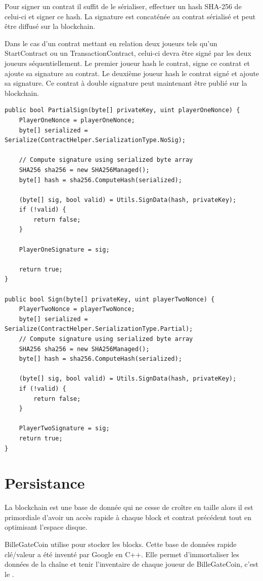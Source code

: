 \documentclass{article}
\begin{document}
Pour signer un contrat il suffit de le sérialiser, effectuer un hash SHA-256 de celui-ci et signer ce hash. La signature est concaténée au contrat sérialisé et peut être diffusé sur la blockchain.

Dans le cas d'un contrat mettant en relation deux joueurs tels qu'un StartContract ou un TransactionContract, celui-ci devra être signé par les deux joueurs séquentiellement. Le premier joueur hash le contrat, signe ce contrat et ajoute sa signature au contrat. Le deuxième joueur hash le contrat signé et ajoute sa signature. Ce contrat à double signature peut maintenant être publié sur la blockchain.

\filbreak
\begin{verbatim}
public bool PartialSign(byte[] privateKey, uint playerOneNonce) {
    PlayerOneNonce = playerOneNonce;
    byte[] serialized = Serialize(ContractHelper.SerializationType.NoSig);
    
    // Compute signature using serialized byte array
    SHA256 sha256 = new SHA256Managed();
    byte[] hash = sha256.ComputeHash(serialized);

    (byte[] sig, bool valid) = Utils.SignData(hash, privateKey);
    if (!valid) {
        return false;
    }

    PlayerOneSignature = sig;

    return true;
}

public bool Sign(byte[] privateKey, uint playerTwoNonce) {
    PlayerTwoNonce = playerTwoNonce;
    byte[] serialized = Serialize(ContractHelper.SerializationType.Partial);
    // Compute signature using serialized byte array
    SHA256 sha256 = new SHA256Managed();
    byte[] hash = sha256.ComputeHash(serialized);

    (byte[] sig, bool valid) = Utils.SignData(hash, privateKey);
    if (!valid) {
        return false;
    }

    PlayerTwoSignature = sig;
    return true;
}
\end{verbatim}

\section{Persistance}
La blockchain est une base de donnée qui ne cesse de croître en taille alors il est primordiale d'avoir un accès rapide à chaque block et contrat précédent tout en optimisant l'espace disque.

BilleGateCoin utilise  pour stocker les blocks. Cette base de données rapide clé/valeur a été inventé par Google en C++. Elle permet d'immortaliser les données de la chaîne et tenir l'inventaire de chaque joueur de BilleGateCoin, c'est le .
\end{document}
